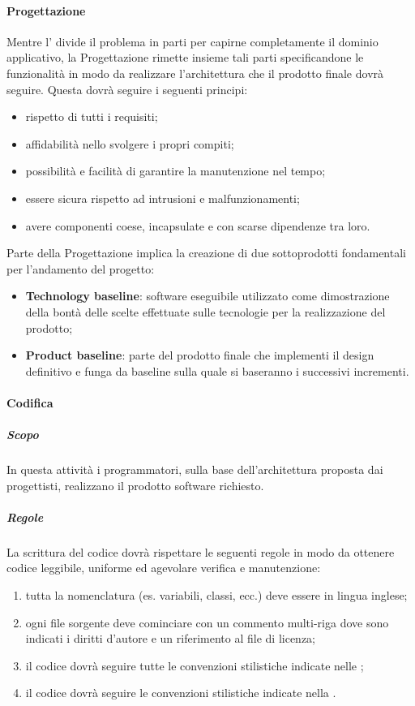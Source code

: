 		\paragraph{Progettazione}
   			Mentre l' divide il problema in parti per capirne completamente il dominio applicativo, la Progettazione rimette insieme tali parti specificandone le funzionalità in modo da realizzare l'architettura che il prodotto finale dovrà seguire. Questa dovrà seguire i seguenti principi:
   			\begin{itemize}
   				\item rispetto di tutti i requisiti;
   				\item affidabilità nello svolgere i propri compiti;
   				\item possibilità e facilità di garantire la manutenzione nel tempo;
   				\item essere sicura rispetto ad intrusioni e malfunzionamenti;
   				\item avere componenti coese, incapsulate e con scarse dipendenze tra loro.
   			\end{itemize}
   			Parte della Progettazione implica la creazione di due sottoprodotti fondamentali per l'andamento del progetto:
   			\begin{itemize}
   				\item \textbf{Technology baseline}: software eseguibile utilizzato come dimostrazione della bontà delle scelte effettuate sulle tecnologie per la realizzazione del prodotto;
   				\item \textbf{Product baseline}: parte del prodotto finale che implementi il design definitivo e funga da baseline sulla quale si baseranno i successivi incrementi.
            \end{itemize}

		\paragraph{Codifica}
   			\subparagraph{Scopo}
   			In questa attività i programmatori, sulla base dell'architettura proposta dai progettisti, realizzano il prodotto software richiesto.

            \subparagraph{Regole}
   			La scrittura del codice dovrà rispettare le seguenti regole in modo da ottenere codice leggibile, uniforme ed agevolare verifica e manutenzione:
   			\begin{enumerate}
                \item tutta la nomenclatura (es. variabili, classi, ecc.) deve essere in lingua inglese;
                \item ogni file sorgente deve cominciare con un commento multi-riga dove sono indicati i diritti d'autore e un riferimento al file di licenza;
                \item il codice  dovrà seguire tutte le convenzioni stilistiche indicate nelle ;
                \item il codice  dovrà seguire le convenzioni stilistiche indicate nella .
            \end{enumerate}

